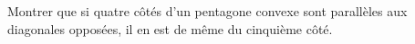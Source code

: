Montrer que si quatre côtés d'un pentagone convexe sont parallèles aux diagonales opposées, il en est de même du cinquième côté.
